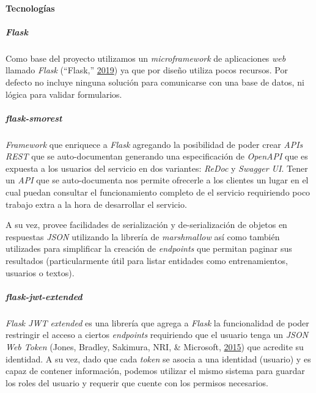 \documentclass[12pt,a4paper,]{scrartcl}
\let\oldparagraph\paragraph
\renewcommand{\paragraph}[1]{\oldparagraph{#1}\mbox{}}
\let\oldsubparagraph\subparagraph
\renewcommand{\subparagraph}[1]{\oldsubparagraph{#1}\mbox{}}
\begin{document}
\hypertarget{tecnologuxedas-1}{%
\paragraph{Tecnologías}\label{tecnologuxedas-1}}

\hypertarget{flask}{%
\subparagraph{\texorpdfstring{\emph{Flask}}{Flask}}\label{flask}}

Como base del proyecto utilizamos un \emph{microframework} de aplicaciones \emph{web} llamado \emph{Flask} (``Flask,'' \protect\hyperlink{ref-flask}{2019}) ya que por diseño utiliza pocos recursos. Por defecto no incluye ninguna solución para comunicarse con una base de datos, ni lógica para validar formularios.

\hypertarget{flask-smorest}{%
\subparagraph{\texorpdfstring{\emph{flask-smorest}}{flask-smorest}}\label{flask-smorest}}

\emph{Framework} que enriquece a \emph{Flask} agregando la posibilidad de poder crear \emph{APIs REST} que se auto-documentan generando una especificación de \emph{OpenAPI} que es expuesta a los usuarios del servicio en dos variantes: \emph{ReDoc} y \emph{Swagger UI}. Tener un \emph{API} que se auto-documenta nos permite ofrecerle a los clientes un lugar en el cual puedan consultar el funcionamiento completo de el servicio requiriendo poco trabajo extra a la hora de desarrollar el servicio.

A su vez, provee facilidades de serialización y de-serialización de objetos en respuestas \emph{JSON} utilizando la librería de \emph{marshmallow} así como también utilizades para simplificar la creación de \emph{endpoints} que permitan paginar sus resultados (particularmente útil para listar entidades como entrenamientos, usuarios o textos).

\hypertarget{flask-jwt-extended}{%
\subparagraph{\texorpdfstring{\emph{flask-jwt-extended}}{flask-jwt-extended}}\label{flask-jwt-extended}}

\emph{Flask JWT extended} es una librería que agrega a \emph{Flask} la funcionalidad de poder restringir el acceso a ciertos \emph{endpoints} requiriendo que el usuario tenga un \emph{JSON Web Token} (Jones, Bradley, Sakimura, NRI, \& Microsoft, \protect\hyperlink{ref-JWT}{2015}) que acredite su identidad. A su vez, dado que cada \emph{token} se asocia a una identidad (usuario) y es capaz de contener información, podemos utilizar el mismo sistema para guardar los roles del usuario y requerir que cuente con los permisos necesarios.
\end{document}
